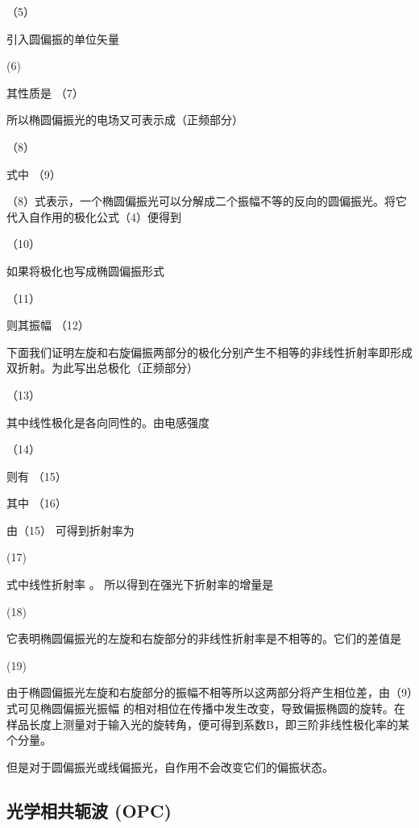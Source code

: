                          （5）

引入圆偏振的单位矢量

                                   (6)

其性质是                        （7）

所以椭圆偏振光的电场又可表示成（正频部分）

                                   （8）

式中                             （9）

（8）式表示，一个椭圆偏振光可以分解成二个振幅不等的反向的圆偏振光。将它代入自作用的极化公式（4）便得到

                   （10）

如果将极化也写成椭圆偏振形式

                                         （11）

则其振幅                           （12）

下面我们证明左旋和右旋偏振两部分的极化分别产生不相等的非线性折射率即形成双折射。为此写出总极化（正频部分）

                                         （13）

其中线性极化是各向同性的。由电感强度

                   （14）

则有                                       （15）

其中                                         （16）

由（15） 可得到折射率为

                                              (17)

式中线性折射率 。 所以得到在强光下折射率的增量是

                                        (18)

它表明椭圆偏振光的左旋和右旋部分的非线性折射率是不相等的。它们的差值是

                                  (19)

由于椭圆偏振光左旋和右旋部分的振幅不相等所以这两部分将产生相位差，由（9）式可见椭圆偏振光振幅 的相对相位在传播中发生改变，导致偏振椭圆的旋转。在样品长度上测量对于输入光的旋转角，便可得到系数B，即三阶非线性极化率的某个分量。

    但是对于圆偏振光或线偏振光，自作用不会改变它们的偏振状态。

\subsection{光学相共轭波 (OPC)}

